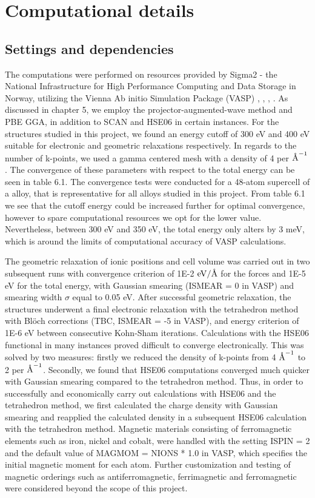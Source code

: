 \chapter{Computational details}
\label{sec:Computation}

\section{Settings and dependencies}

The computations were performed on resources provided by Sigma2 - the National Infrastructure for High Performance Computing and Data Storage in Norway, utilizing the Vienna Ab initio Simulation Package (VASP) \cite{vasp1}, \cite{vasp2}, \cite{vasp3}, \cite{vasp4}. As discussed in chapter 5, we employ the projector-augmented-wave method and PBE GGA, in addition to SCAN and HSE06 in certain instances. For the structures studied in this project, we found an energy cutoff of 300 eV and 400 eV suitable for electronic and geometric relaxations respectively. In regards to the number of k-points, we used a gamma centered mesh with a density of 4 per $\AA^{-1}$. The convergence of these parameters with respect to the total energy can be seen in table 6.1. The convergence tests were conducted for a 48-atom supercell of a  alloy, that is representative for all alloys studied in this project. From table 6.1 we see that the cutoff energy could be increased further for optimal convergence, however to spare computational resources we opt for the lower value. Nevertheless, between 300 eV and 350 eV, the total energy only alters by 3 meV, which is around the limits of computational accuracy of VASP calculations.  

The geometric relaxation of ionic positions and cell volume was carried out in two subsequent runs with convergence criterion of \num{1E-2} $\si{\eV}/\AA$ for the forces and \num{1E-5} eV for the total energy, with Gaussian smearing (ISMEAR = 0 in VASP) and smearing width $\sigma$ equal to 0.05 eV. After successful geometric relaxation, the structures underwent a final electronic relaxation with the tetrahedron method with Bl\"{o}ch corrections (TBC, ISMEAR = -5 in VASP), and energy criterion of \num{1E-6} eV between consecutive Kohn-Sham iterations. Calculations with the HSE06 functional in many instances proved difficult to converge electronically. This was solved by two measures: firstly we reduced the density of k-points from 4 $\AA^{-1}$ to 2 per $\AA^{-1}$. Secondly, we found that HSE06 computations converged much quicker with Gaussian smearing compared to the tetrahedron method. Thus, in order to successfully and economically carry out calculations with HSE06 and the tetrahedron method, we first calculated the charge density with Gaussian smearing and reapplied the calculated density in a subsequent HSE06 calculation with the tetrahedron method. Magnetic materials consisting of ferromagnetic elements such as iron, nickel and cobalt, were handled with the setting ISPIN = 2 and the default value of MAGMOM = NIONS * 1.0 in VASP, which specifies the initial magnetic moment for each atom.  Further customization and testing of magnetic orderings such as antiferromagnetic, ferrimagnetic and ferromagnetic were considered beyond the scope of this project.  

